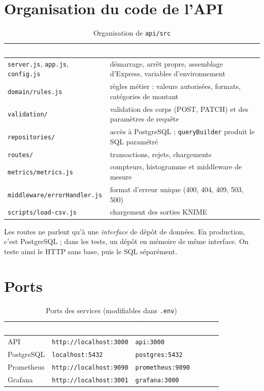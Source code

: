 \section{Organisation du code de l'API}
\begin{table}[H]
\centering\small
\caption{Organisation de \texttt{api/src}}
\begin{tabularx}{\linewidth}{|l|X|}
\hline
\rowcolor{bluedark}\textcolor{white}{\textbf{Dossier ou fichier}} & \textcolor{white}{\textbf{Contenu}} \\
\hline
\texttt{server.js}, \texttt{app.js}, \texttt{config.js} & démarrage, arrêt propre, assemblage d'Express, variables d'environnement \\
\hline
\texttt{domain/rules.js} & règles métier : valeurs autorisées, formats, catégories de montant \\
\hline
\texttt{validation/} & validation des corps (POST, PATCH) et des paramètres de requête \\
\hline
\texttt{repositories/} & accès à PostgreSQL ; \texttt{queryBuilder} produit le SQL paramétré \\
\hline
\texttt{routes/} & transactions, rejets, chargements \\
\hline
\texttt{metrics/metrics.js} & compteurs, histogramme et middleware de mesure \\
\hline
\texttt{middleware/errorHandler.js} & format d'erreur unique (400, 404, 409, 503, 500) \\
\hline
\texttt{scripts/load-csv.js} & chargement des sorties KNIME \\
\hline
\end{tabularx}
\end{table}

Les routes ne parlent qu'à une \emph{interface} de dépôt de données. En production, c'est
PostgreSQL ; dans les tests, un dépôt en mémoire de même interface. On teste ainsi le HTTP sans
base, puis le SQL séparément.

\section{Ports}
\begin{table}[H]
\centering\small
\caption{Ports des services (modifiables dans \texttt{.env})}
\begin{tabular}{|l|l|l|}
\hline
\rowcolor{bluedark}\textcolor{white}{\textbf{Service}} & \textcolor{white}{\textbf{Sur le poste}} & \textcolor{white}{\textbf{Dans le réseau Docker}} \\
\hline
API & \texttt{http://localhost:3000} & \texttt{api:3000} \\
\hline
PostgreSQL & \texttt{localhost:5432} & \texttt{postgres:5432} \\
\hline
Prometheus & \texttt{http://localhost:9090} & \texttt{prometheus:9090} \\
\hline
Grafana & \texttt{http://localhost:3001} & \texttt{grafana:3000} \\
\hline
\end{tabular}
\end{table}
